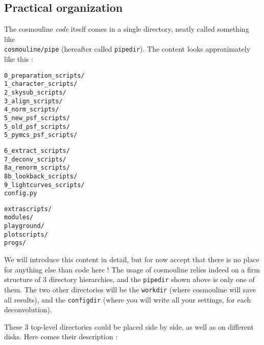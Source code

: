 \subsection{Practical organization}

The cosmouline \emph{code} itself comes in a single directory, neatly called something like\\ \verb+cosmouline/pipe+ (hereafter called \verb+pipedir+). The content looks approximately like this :

\vspace{0.5cm}
\begin{minipage}[t]{4cm}
\begin{verbatim}
0_preparation_scripts/	
1_character_scripts/	
2_skysub_scripts/	
3_align_scripts/	
4_norm_scripts/		
5_new_psf_scripts/
5_old_psf_scripts/
5_pymcs_psf_scripts/
\end{verbatim}
\end{minipage}
\hspace{0.5cm}
\begin{minipage}[t]{4cm}
\begin{verbatim}
6_extract_scripts/	
7_deconv_scripts/
8a_renorm_scripts/
8b_lookback_scripts/
9_lightcurves_scripts/
config.py		
\end{verbatim}
\end{minipage}
\hspace{0.5cm}
\begin{minipage}[t]{4cm}
\begin{verbatim}
extrascripts/
modules/
playground/
plotscripts/
progs/
\end{verbatim}
\end{minipage}
\vspace{0.5cm}

We will introduce this content in detail, but for now accept that there is no place for anything else than code here ! The usage of cosmouline relies indeed on a firm structure of 3 directory hierarchies, and the \verb+pipedir+ shown above is only one of them. The two other directories will be the \verb+workdir+ (where cosmouline will save all results), and the \verb+configdir+ (where you will write all your settings, for each deconvolution).

These 3 top-level directories could be placed side by side, as well as on different disks. Here comes their description :

